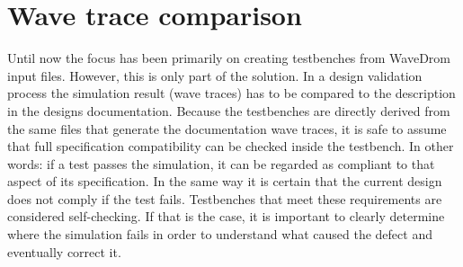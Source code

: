 \section{Wave trace comparison}
Until now the focus has been primarily on creating testbenches from WaveDrom input files. However, this is only part of the solution. In a design validation process the simulation result (wave traces) has to be compared to the description in the designs documentation.
\npar
Because the testbenches are directly derived from the same files that generate the documentation wave traces, it is safe to assume that full specification compatibility can be checked inside the testbench. In other words: if a test passes the simulation, it can be regarded as compliant to that aspect of its specification. In the same way it is certain that the current design does not comply if the test fails. Testbenches that meet these requirements are considered self-checking. If that is the case, it is important to clearly determine where the simulation fails in order to understand what caused the defect and eventually correct it.
